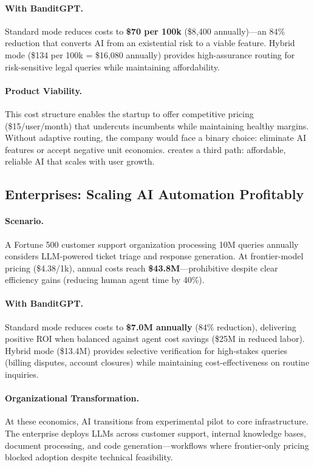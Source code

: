 \paragraph{With BanditGPT.} Standard mode reduces costs to \textbf{\$70 per 100k} (\$8,400 annually)---an 84\% reduction that converts AI from an existential risk to a viable feature. Hybrid mode (\$134 per 100k = \$16,080 annually) provides high-assurance routing for risk-sensitive legal queries while maintaining affordability.

\paragraph{Product Viability.} This cost structure enables the startup to offer competitive pricing (\$15/user/month) that undercuts incumbents while maintaining healthy margins. Without adaptive routing, the company would face a binary choice: eliminate AI features or accept negative unit economics. \ours{} creates a third path: affordable, reliable AI that scales with user growth.

\subsection{Enterprises: Scaling AI Automation Profitably}

\paragraph{Scenario.} A Fortune 500 customer support organization processing 10M queries annually considers LLM-powered ticket triage and response generation. At frontier-model pricing (\$4.38/1k), annual costs reach \textbf{\$43.8M}---prohibitive despite clear efficiency gains (reducing human agent time by 40\%).

\paragraph{With BanditGPT.} Standard mode reduces costs to \textbf{\$7.0M annually} (84\% reduction), delivering positive ROI when balanced against agent cost savings (\$25M in reduced labor). Hybrid mode (\$13.4M) provides selective verification for high-stakes queries (billing disputes, account closures) while maintaining cost-effectiveness on routine inquiries.

\paragraph{Organizational Transformation.} At these economics, AI transitions from experimental pilot to core infrastructure. The enterprise deploys LLMs across customer support, internal knowledge bases, document processing, and code generation---workflows where frontier-only pricing blocked adoption despite technical feasibility.

